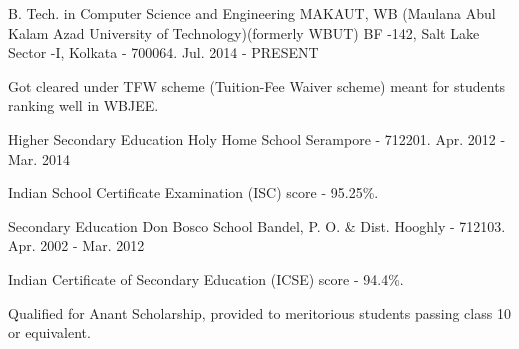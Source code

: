 


\begin{cventries}


\cventry
{B. Tech.  in Computer Science and Engineering} %
{MAKAUT, WB (Maulana Abul Kalam Azad University of Technology)\newline (formerly WBUT)} %
{BF -142, Salt Lake Sector -I, \newline
Kolkata - 700064.} %
{Jul. 2014 - PRESENT} %
{ %
\begin{cvitems}
\item {Got cleared under TFW scheme (Tuition-Fee Waiver scheme) meant for students ranking well in WBJEE.}
\end{cvitems}
}


\cventry
{Higher Secondary Education} %
{Holy Home School} %
{Serampore - 712201.} %
{Apr. 2012 - Mar. 2014} %
{ %
\begin{cvitems}
\item {Indian School Certificate Examination (ISC) score - 95.25\%.}
\end{cvitems}
}


\cventry
{Secondary Education} %
{Don Bosco School} %
{Bandel, P. O. \& Dist. Hooghly - 712103.} %
{Apr. 2002 - Mar. 2012} %
{ %
\begin{cvitems}
\item {Indian Certificate of Secondary Education (ICSE) score - 94.4\%.}
\item {Qualified for Anant Scholarship, provided to meritorious students passing class 10 or equivalent.}
\end{cvitems}
}


\end{cventries}